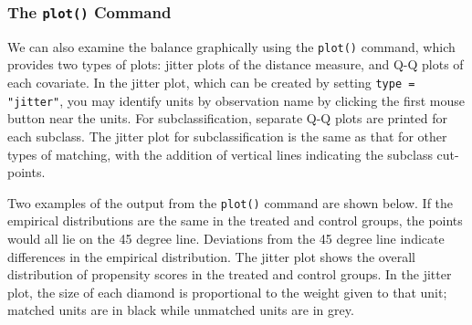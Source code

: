 \subsubsection{The \texttt{plot()} Command}

We can also examine the balance graphically using the \texttt{plot()}
command, which provides two types of plots: jitter plots of the
distance measure, and Q-Q plots of each covariate.  In the jitter
plot, which can be created by setting \texttt{type = "jitter"}, you
may identify units by observation name by clicking the first mouse
button near the units. For subclassification, separate Q-Q plots are
printed for each subclass.  The jitter plot for subclassification is
the same as that for other types of matching, with the addition of
vertical lines indicating the subclass cut-points.



Two examples of the output from the {\tt plot()} command are shown
below.  If the empirical distributions are the same in the treated and
control groups, the points would all lie on the 45 degree line.
Deviations from the 45 degree line indicate differences in the
empirical distribution.  The jitter plot shows the overall
distribution of propensity scores in the treated and control groups.
In the jitter plot, the size of each diamond is proportional to the
weight given to that unit; matched units are in black while unmatched
units are in grey.

